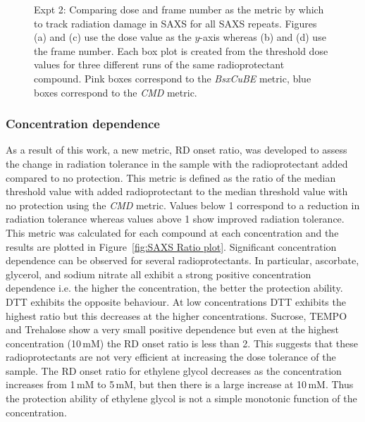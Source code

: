 \begin{figure}
\begin{subfigure}[b]{0.72\textwidth}
            \caption{}
            \label{fig:SAXS frame- 10mM}
    \end{subfigure}
    \caption[Comparing dose and frame number as the metric by which to track radiation damage in SAXS.]{Expt 2: Comparing dose and frame number as the metric by which to track radiation damage in SAXS for all SAXS repeats.
    Figures (a) and (c) use the dose value as the $y$-axis whereas (b) and (d) use the frame number.
    Each box plot is created from the threshold dose values for three different runs of the same radioprotectant compound.
    Pink boxes correspond to the \textit{BsxCuBE} metric, blue boxes correspond to the \textit{CMD} metric.}
    \label{fig:SAXS dose vs frame}
\end{figure}

\subsubsection{Concentration dependence}
\label{subs:Concentration dependence}
As a result of this work, a new metric, RD onset ratio, was developed to assess the change in radiation tolerance in the sample with the radioprotectant added compared to no protection.
This metric is defined as the ratio of the median threshold value with added radioprotectant to the median threshold value with no protection using the \textit{CMD} metric.
Values below 1 correspond to a reduction in radiation tolerance whereas values above 1 show improved radiation tolerance.
This metric was calculated for each compound at each concentration and the results are plotted in Figure~\ref{fig:SAXS Ratio plot}.
Significant concentration dependence can be observed for several radioprotectants.
In particular, ascorbate, glycerol, and sodium nitrate all exhibit a strong positive concentration dependence i.e. the higher the concentration, the better the protection ability.
DTT exhibits the opposite behaviour.
At low concentrations DTT exhibits the highest ratio but this decreases at the higher concentrations.
Sucrose, TEMPO and Trehalose show a very small positive dependence but even at the highest concentration (10\,mM) the RD onset ratio is less than 2.
This suggests that these radioprotectants are not very efficient at increasing the dose tolerance of the sample.
The RD onset ratio for ethylene glycol decreases as the concentration increases from 1\,mM to 5\,mM, but then there is a large increase at 10$\,$mM.
Thus the protection ability of ethylene glycol is not a simple monotonic function of the concentration.
